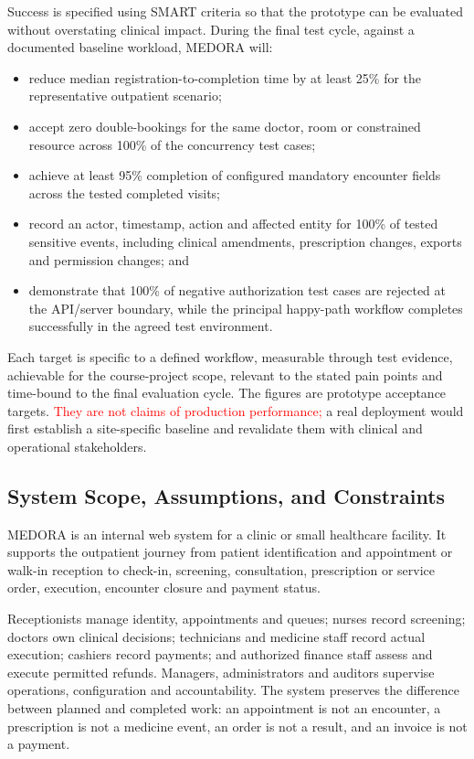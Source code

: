 \documentclass[a4paper,12pt]{article}
\newcommand{\weak}[1]{\textcolor{red}{#1}}
\begin{document}
Success is specified using SMART criteria so that the prototype can be evaluated without overstating clinical impact. During the final test cycle, against a documented baseline workload, MEDORA will:

\begin{itemize}[leftmargin=1.4em]
    \item reduce median registration-to-completion time by at least 25\% for the representative outpatient scenario;
    \item accept zero double-bookings for the same doctor, room or constrained resource across 100\% of the concurrency test cases;
    \item achieve at least 95\% completion of configured mandatory encounter fields across the tested completed visits;
    \item record an actor, timestamp, action and affected entity for 100\% of tested sensitive events, including clinical amendments, prescription changes, exports and permission changes; and
    \item demonstrate that 100\% of negative authorization test cases are rejected at the API/server boundary, while the principal happy-path workflow completes successfully in the agreed test environment.
\end{itemize}

Each target is specific to a defined workflow, measurable through test evidence, achievable for the course-project scope, relevant to the stated pain points and time-bound to the final evaluation cycle. The figures are prototype acceptance targets. \weak{They are not claims of production performance;} a real deployment would first establish a site-specific baseline and revalidate them with clinical and operational stakeholders.

\subsection{System Scope, Assumptions, and Constraints}
MEDORA is an internal web system for a clinic or small healthcare facility. It supports the outpatient journey from patient identification and appointment or walk-in reception to check-in, screening, consultation, prescription or service order, execution, encounter closure and payment status.

Receptionists manage identity, appointments and queues; nurses record screening; doctors own clinical decisions; technicians and medicine staff record actual execution; cashiers record payments; and authorized finance staff assess and execute permitted refunds. Managers, administrators and auditors supervise operations, configuration and accountability. The system preserves the difference between planned and completed work: an appointment is not an encounter, a prescription is not a medicine event, an order is not a result, and an invoice is not a payment.
\end{document}

